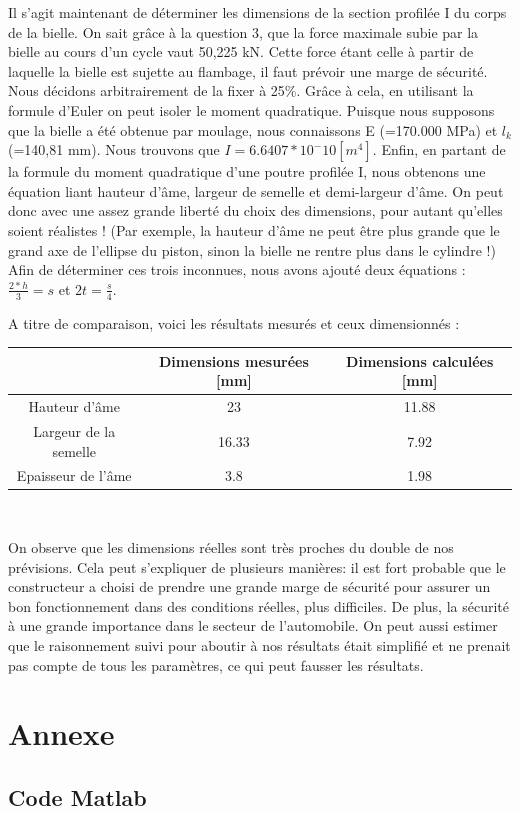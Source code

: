 \documentclass[a4paper,oneside,12pt]{report}
\begin{document}
Il s'agit maintenant de déterminer les dimensions de la section profilée I du corps de la bielle. On sait grâce à la question 3, que la force maximale subie par la bielle au cours d'un cycle vaut 50,225 kN. Cette force étant celle à partir de laquelle la bielle est sujette au flambage, il faut prévoir une marge de sécurité. Nous décidons arbitrairement de la fixer à 25\%. Grâce à cela, en utilisant la formule d'Euler on peut isoler le moment quadratique. Puisque nous supposons que la bielle a été obtenue par moulage, nous connaissons E (=170.000 MPa) et $l_k$ (=140,81 mm). Nous trouvons que $I = 6.6407*10^-10 [m^4]$. Enfin, en partant de la formule du moment quadratique d'une poutre profilée I, nous obtenons une équation liant hauteur d'âme, largeur de semelle et demi-largeur d'âme. On peut donc avec une assez grande liberté du choix des dimensions, pour autant qu'elles soient réalistes ! (Par exemple, la hauteur d'âme ne peut être plus grande que le grand axe de l'ellipse du piston, sinon la bielle ne rentre plus dans le cylindre !)
Afin de déterminer ces trois inconnues, nous avons ajouté deux équations : $\frac{2*h}{3} = s$ et $2t=\frac{s}{4}$.

A titre de comparaison, voici les résultats mesurés et ceux dimensionnés : 
\begin{center}
\begin{tabular}{|c||c|c|}
\hline 
\ & Dimensions mesurées [mm]  & Dimensions calculées [mm] \\ 
\hline 
Hauteur d'âme & 23 & 11.88 \\ 
\hline 
Largeur de la semelle & 16.33 & 7.92 \\ 
\hline 
Epaisseur de l'âme & 3.8 & 1.98 \\
\hline
\end{tabular} \\
\end{center}

On observe que les dimensions réelles sont très proches du double de nos prévisions. Cela peut s'expliquer de plusieurs manières: il est fort probable que le constructeur a choisi de prendre une grande marge de sécurité pour assurer un bon fonctionnement dans des conditions réelles, plus difficiles. De plus, la sécurité à une grande importance dans le secteur de l'automobile. On peut aussi estimer que le raisonnement suivi pour aboutir à nos résultats était simplifié et ne prenait pas compte de tous les paramètres, ce qui peut fausser les résultats.

\chapter{Annexe}

\section{Code Matlab}
\end{document}

